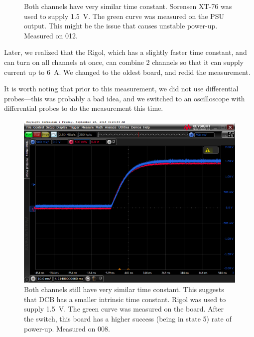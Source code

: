 \documentclass[11pt,letterpaper]{refart}
\begin{document}
\begin{figure}[ht]
\begin{subfigure}{0.5\linewidth}
    \caption{}
    \end{subfigure}
    \caption[Power-on vs. reset]{
        Both channels have very similar time constant.
        Sorensen XT-76 was used to supply \SI{1.5}{\volt}.
        The green curve was measured on the PSU output.
        This might be the issue that causes unstable power-up.
        Measured on 012.
    }
\end{figure}

Later, we realized that the Rigol, which has a slightly faster time constant,
and can turn on all channels at once, can combine 2 channels so that it can
supply current up to \SI{6}{\ampere}. We changed to the oldest board, and redid
the measurement.

It is worth noting that prior to this measurement, we did not use differential
probes---this was probably a bad idea, and we switched to an oscilloscope with
differential probes to do the measurement this time.

\begin{figure}[ht]
    \centering
    \includegraphics[width=0.8\linewidth]
        {./res/power_on_reset/power_on_reset-008.png}
    \caption[Power-on vs. reset, oldest board]{
        Both channels still have very similar time constant.
        This suggests that DCB has a smaller intrinsic time constant.
        Rigol was used to supply \SI{1.5}{\volt}.
        The green curve was measured on the board.
        After the switch, this board has a higher success (being in state 5)
        rate of power-up.
        Measured on 008.
    }
\end{figure}
\end{document}
